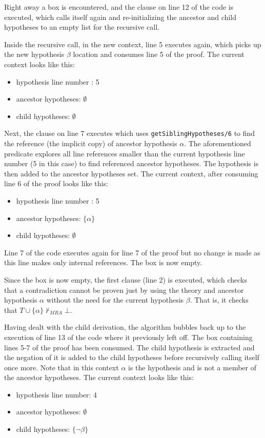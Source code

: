 \documentclass[11pt,twoside,a4paper]{report}
\begin{document}
Right away a box is encountered, and the clause on line 12 of the code is executed, which calls itself again and re-initializing the ancestor and child hypotheses to an empty list for the recursive call.

Inside the recursive call, in the new context, line 5 executes again, which picks up the new hypothesis $\beta$ location and consumes line 5 of the proof. The current context looks like this:
\begin{itemize}
\item
hypothesis line number : 5
\item
ancestor hypotheses: $\emptyset$
\item
child hypotheses: $\emptyset$
\end{itemize}

Next, the clause on line 7 executes which uses \lstinline$getSiblingHypotheses/6$ to find the reference (the implicit copy) of ancestor hypothesis $\alpha$. The aforementioned predicate explores all line references smaller than the current hypothesis line number (5 in this case) to find referenced ancestor hypotheses. The hypothesis is then added to the ancestor hypotheses set. The current context, after consuming line 6 of the proof looks like this: 
\begin{itemize}
\item
hypothesis line number : 5
\item
ancestor hypotheses: $\{\alpha\}$
\item
child hypotheses: $\emptyset$
\end{itemize}

Line 7 of the code executes again for line 7 of the proof but no change is made as this line makes only internal references. The box is now empty.

Since the box is now empty, the first clause (line 2) is executed, which checks that a contradiction cannot be proven just by using the theory and ancestor hypothesis $\alpha$ without the need for the current hypothesis $\beta$. That is, it checks that $T\cup\{\alpha\}\nvdash_{MRA}\bot$.

Having dealt with the child derivation, the algorithm bubbles back up to the execution of line 13 of the code where it previously left off. The box containing lines 5-7 of the proof has been consumed. The child hypothesis is extracted and the negation of it is added to the child hypotheses before recursively calling itself once more. Note that in this context $\alpha$ is the hypothesis and is not a member of the ancestor hypotheses. The current context looks like this:
\begin{itemize}
\item
hypothesis line number: 4
\item
ancestor hypotheses: $\emptyset$
\item
child hypotheses: $\{\neg\beta\}$
\end{itemize}
\end{document}
